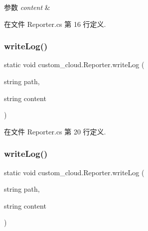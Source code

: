\begin{DoxyParams}{参数}
{\em content} & \\
\hline
\end{DoxyParams}


在文件 Reporter.\+cs 第 16 行定义.

\mbox{\label{classcustom__cloud_1_1_reporter_ae1c917d6f0e059b068b5c6c0e0436293}} 
\subsubsection{\texorpdfstring{write\+Log()}{writeLog()}\hspace{0.1cm}{\footnotesize\ttfamily [1/2]}}
{\footnotesize\ttfamily static void custom\+\_\+cloud.\+Reporter.\+write\+Log (\begin{DoxyParamCaption}\item[{string}]{path,  }\item[{string}]{content }\end{DoxyParamCaption})\hspace{0.3cm}{\ttfamily [static]}}



在文件 Reporter.\+cs 第 20 行定义.

\mbox{\label{classcustom__cloud_1_1_reporter_ae1c917d6f0e059b068b5c6c0e0436293}} 
\subsubsection{\texorpdfstring{write\+Log()}{writeLog()}\hspace{0.1cm}{\footnotesize\ttfamily [2/2]}}
{\footnotesize\ttfamily static void custom\+\_\+cloud.\+Reporter.\+write\+Log (\begin{DoxyParamCaption}\item[{string}]{path,  }\item[{string}]{content }\end{DoxyParamCaption})\hspace{0.3cm}{\ttfamily [static]}}



